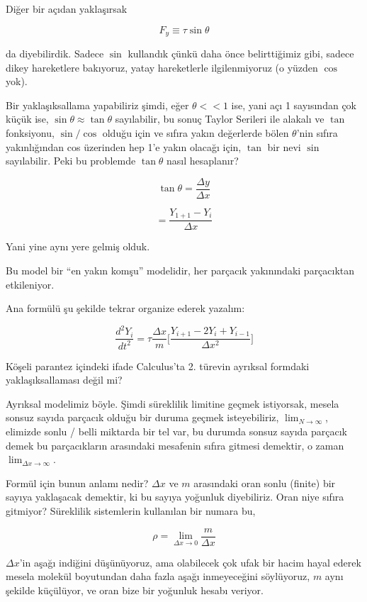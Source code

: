 \documentclass[12pt,fleqn]{article}\usepackage{../../common}
\begin{document}
Diğer bir açıdan yaklaşırsak

$$ F_y \equiv \tau \sin\theta $$

da diyebilirdik. Sadece $\sin$ kullandık çünkü daha önce belirttiğimiz gibi,
sadece dikey hareketlere bakıyoruz, yatay hareketlerle ilgilenmiyoruz (o
yüzden $\cos$ yok).

Bir yaklaşıksallama yapabiliriz şimdi, eğer $\theta << 1$ ise, yani açı 1
sayısından çok küçük ise, $\sin \theta \approx \tan \theta$ sayılabilir, bu
sonuç Taylor Serileri ile alakalı ve $\tan$ fonksiyonu, $\sin / \cos$
olduğu için ve sıfıra yakın değerlerde bölen $\theta$'nin sıfıra
yakınlığından cos üzerinden hep 1'e yakın olacağı için, $\tan$ bir nevi
$\sin$ sayılabilir. Peki bu problemde $\tan \theta$ nasıl hesaplanır?

$$  \tan\theta = \frac{\Delta y}{\Delta x} $$

$$ = \frac{Y_{1+1}-Y_i}{\Delta x} $$

Yani yine aynı yere gelmiş olduk. 

Bu model bir ``en yakın komşu'' modelidir, her parçacık yakınındaki
parçacıktan etkileniyor. 

Ana formülü şu şekilde tekrar organize ederek yazalım:

$$ \frac{d^2Y_i}{dt^2} = 
\tau \frac{\Delta x}{m} \bigg[
\frac{Y_{i+1} - 2Y_i + Y_{i-1}}{\Delta x^2}
\bigg]
$$

Köşeli parantez içindeki ifade Calculus'ta 2. türevin ayrıksal formdaki
yaklaşıksallaması değil mi?

Ayrıksal modelimiz böyle. Şimdi süreklilik limitine geçmek istiyorsak,
mesela sonsuz sayıda parçacık olduğu bir duruma geçmek isteyebiliriz,
$\lim_{N \to \infty}$, elimizde sonlu / belli miktarda bir tel var, bu durumda 
sonsuz sayıda parçacık demek bu parçacıkların arasındaki mesafenin sıfıra 
gitmesi demektir, o zaman $\lim_{\Delta x \to \infty}$. 

Formül için bunun anlamı nedir? $\Delta x$ ve $m$ arasındaki oran sonlu
(finite) bir sayıya yaklaşacak demektir, ki bu sayıya yoğunluk
diyebiliriz. Oran niye sıfıra gitmiyor? Süreklilik sistemlerin kullanılan
bir numara bu,

$$ \rho = \lim_{\Delta x \to 0} \frac{m}{\Delta x} $$

$\Delta x$'in aşağı indiğini düşünüyoruz, ama olabilecek çok ufak bir hacim
hayal ederek mesela molekül boyutundan daha fazla aşağı inmeyeceğini
söylüyoruz, $m$ aynı şekilde küçülüyor, ve oran bize bir yoğunluk hesabı
veriyor.
\end{document}
